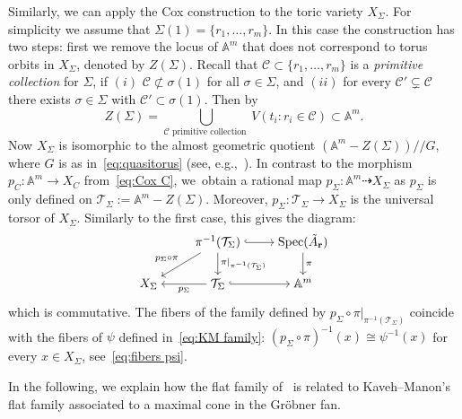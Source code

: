 \documentclass[pdftex]{sigma}%
\numberwithin{equation}{section}
\begin{document}
Similarly, we can apply the Cox construction to the toric variety $X_\Sigma$. For simplicity we assume that $\Sigma(1)=\{{r}_1,\dots,{r}_{m}\}$.
 In this case the construction has two steps: first we remove the locus of $\mathbb A^m$ that does not correspond to torus orbits in $X_{\Sigma}$, denoted by $Z(\Sigma)$.
 Recall that $\mathcal C\subset \{{r}_1,\dots,{r}_m\}$ is a {\it primitive collection} for $\Sigma$, if $(i)$ $\mathcal C\not\subset \sigma(1)$ for all $\sigma\in \Sigma$, and $(ii)$ for every $\mathcal C'\subsetneq \mathcal C$ there exists $\sigma\in \Sigma$ with $\mathcal C'\subset \sigma(1)$.
 Then by~\cite[Proposition 5.1.6]{CLS}
 \begin{equation}\label{eq:Z(Sigma)}
 Z(\Sigma)=\bigcup_{\mathcal C \text{ primitive collection }} V(t_i\colon r_i\in \mathcal C) \subset \mathbb A^m.
 \end{equation}
 Now $X_{\Sigma}$ is isomorphic to the almost geometric quotient $(\mathbb A^m-Z(\Sigma))/\!/G$, where $G$ is as in~\eqref{eq:quasitorus} (see, e.g.,~\cite[Theorem~5.1.11]{CLS}).
 In contrast to the morphism $p_C\colon \mathbb A^m\to X_C$ from~\eqref{eq:Cox C}, we~obtain a rational map $p_\Sigma\colon \mathbb A^m\dashrightarrow X_\Sigma$ as $p_\Sigma$ is only defined on $\mathcal T_\Sigma:=\mathbb A^m-Z(\Sigma)$.
 Moreover, $p_\Sigma\colon \mathcal T_\Sigma\to X_\Sigma$ is the universal torsor of $X_\Sigma$.
 Similarly to the first case, this gives the diagram:
 \begin{equation}\label{eq:Cox Sigma}
 \begin{tikzcd}[ampersand replacement=\&,cramped]
 \& \pi^{-1}(\mathcal T_\Sigma)\ar[d,"\pi\vert_{\pi^{-1}(\mathcal T_\Sigma)}"] \ar[dl,"p_\Sigma\circ \pi"']\ar[r,hook] \& \operatorname{Spec}(\tilde A_{\bf r})\ar[d,"\pi"] \\
 X_{\Sigma} \& \mathcal T_\Sigma \ar[l,"p_\Sigma"]\ar[r,hook]\& \mathbb A^m
 \end{tikzcd}
 \end{equation}
 which is commutative. The fibers of the family defined by $p_\Sigma\circ \pi\vert_{\pi^{-1}(\mathcal T_\Sigma)}$ coincide with the fibers of $\psi$ defined in~\eqref{eq:KM family}: $(p_\Sigma\circ \pi)^{-1}(x)\cong \psi^{-1}(x)$ for every $x\in X_\Sigma$, see~\eqref{eq:fibers psi}.




In the following, we explain how the flat family of~ is related to Kaveh--Manon's flat family associated to a maximal cone in the Gr\"obner fan.
\end{document}
